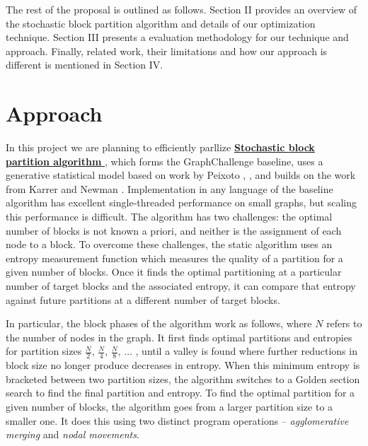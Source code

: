 \documentclass[conference]{IEEEtran}
\begin{document}
The rest of the proposal is outlined as follows. Section II provides an overview of the stochastic block partition algorithm
and details of our optimization technique. Section III presents a evaluation methodology for our technique and approach. Finally, related work, their limitations and how our approach is different is mentioned in Section IV.

	\section{Approach}

		In this project we are planning to efficiently parllize \href{https://github.com/graphchallenge/GraphChallenge/tree/master/StochasticBlockPartition}{ \textbf{Stochastic block partition algorithm} }, which forms the
GraphChallenge baseline, uses a generative statistical model
based on work by Peixoto \cite{b2}, \cite{b3}, \cite{b4} and builds on the
work from Karrer and Newman \cite{b5}. Implementation in any language of the baseline algorithm has excellent single-threaded performance on small graphs, but scaling this performance is difficult. The algorithm has two
	challenges: the optimal number of blocks is not known a
	priori, and neither is the assignment of each node to a block. To overcome these challenges, the static algorithm uses an
	entropy measurement function which measures the quality of
	a partition for a given number of blocks. Once it finds the
	optimal partitioning at a particular number of target blocks
	and the associated entropy, it can compare that entropy against
	future partitions at a different number of target blocks.

	In particular, the block phases of the algorithm work as
	follows, where $N$ refers to the number of nodes in the graph.
	It first finds optimal partitions and entropies for partition sizes
	$\frac{N}{2}$, $\frac{N}{4}$, $\frac{N}{8}$, $\ldots$ , until a valley is found where further reductions
	in block size no longer produce decreases in entropy. When
	this minimum entropy is bracketed between two partition
	sizes, the algorithm switches to a Golden section search
	to find the final partition and entropy. To find the optimal
	partition for a given number of blocks, the algorithm goes
	from a larger partition size to a smaller one. It does this using
	two distinct program operations – \textit{agglomerative merging} and
	\textit{nodal movements}.
\end{document}
